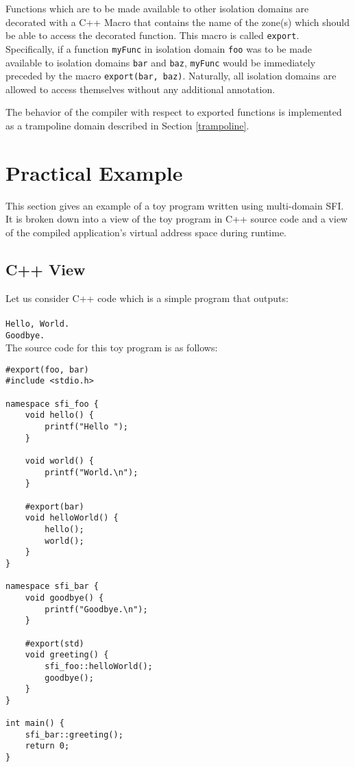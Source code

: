 \documentclass[12pt]{article}
\begin{document}
Functions which are to be made available to other isolation domains are decorated with a C++ Macro that contains the name of the zone(s) which should be able to access the decorated function. This macro is called \texttt{export}. Specifically, if a function \texttt{myFunc} in isolation domain \texttt{foo} was to be made available to isolation domains \texttt{bar} and \texttt{baz}, \texttt{myFunc} would be immediately preceded by the macro \texttt{export(bar, baz)}. Naturally, all isolation domains are allowed to access themselves without any additional annotation.

The behavior of the compiler with respect to exported functions is implemented as a trampoline domain described in Section \ref{trampoline}.

\section{Practical Example}

This section gives an example of a toy program written using multi-domain SFI. It is broken down into a view of the toy program in C++ source code and a view of the compiled application's virtual address space during runtime.
\subsection{C++ View}

Let us consider C++ code which is a simple program that outputs:\\ \\
\texttt{Hello, World.\\Goodbye.}\\

\noindent The source code for this toy program is as follows:

\begin{verbatim}
#export(foo, bar)
#include <stdio.h>

namespace sfi_foo {
	void hello() {
		printf("Hello ");
	}
	
	void world() {
		printf("World.\n");
	}
	
	#export(bar)
	void helloWorld() {
		hello();
		world();
	}
}

namespace sfi_bar {
	void goodbye() {
		printf("Goodbye.\n");
	}
	
	#export(std)
	void greeting() {
		sfi_foo::helloWorld();
		goodbye();
	}
}

int main() {
	sfi_bar::greeting();
	return 0;
}

\end{verbatim}
\end{document}

